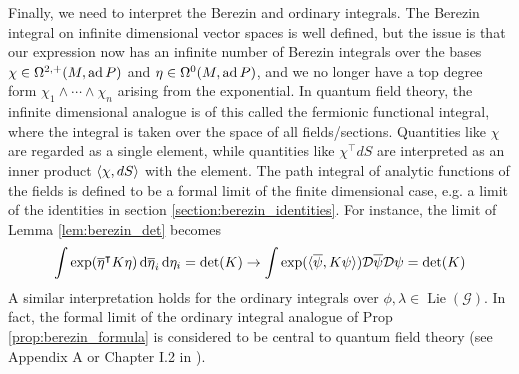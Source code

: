 Finally, we need to interpret the Berezin and ordinary integrals. 
The Berezin integral on infinite dimensional vector spaces is well defined, 
but the issue is that our expression now has an infinite number of Berezin
integrals over the bases $\chi \in \Omega^{2,+}(M,\operatorname{ad} P)$ and 
$\eta\in\Omega^0(M, \operatorname{ad} P)$, and we no longer have a top
degree form $\chi_1\wedge\cdots\wedge\chi_n$ arising from the exponential. 
In quantum field theory, the infinite 
dimensional analogue is of this called the fermionic functional integral, where 
the integral is taken over the space of all fields/sections. 
Quantities like $\chi$ are regarded as a single element, while 
quantities like $\chi^\intercal dS$ are interpreted as an inner product $\gen{\chi,dS}$ 
with the element. The path integral of analytic functions of the fields is 
defined to be a formal limit of the finite dimensional case, e.g. a limit of the
identities in section \ref{section:berezin_identities}. For instance, the limit
of Lemma \ref{lem:berezin_det} becomes
\[
\int \exp(\overline{\eta}^\intercal K \eta) 
\odif{\overline{\eta}_i}\odif{\eta_i} = \det (K)
\to 
\int \exp(\gen[*]{\overline{\psi},K\psi}) \mathcal{D}\overline{\psi}
\mathcal{D}\psi = \det (K)
\] 
A similar interpretation holds for the ordinary integrals over $\phi,\lambda \in
\operatorname{Lie}(\mathcal{G})$. In fact, the formal limit of the ordinary
integral analogue of Prop \ref{prop:berezin_formula} is considered to be central
to quantum field theory (see Appendix A or Chapter I.2 in \cite{zee_qft}).


